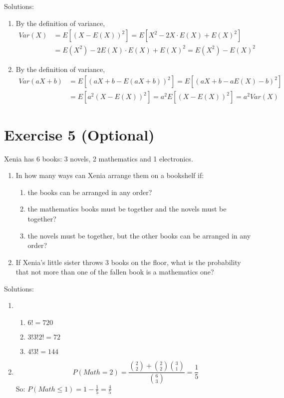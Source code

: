 \documentclass[12pt,thmsa]{article}
\begin{document}
\noindent Solutions:
\begin{enumerate}
\item By the definition of variance,
  \begin{align*}
    Var(X)&=E[(X-E(X))^2]=E[X^2-2X\cdot E(X)+E(X)^2]\\
    &=E(X^2)-2E(X)\cdot E(X)+E(X)^2=E(X^2)-E(X)^2
  \end{align*}
 \item By the definition of variance,
  \begin{align*}
    Var(aX+b)&=E[(aX+b-E(aX+b))^2]=E[(aX+b-aE(X)-b)^2]\\
&=E[a^2(X-E(X))^2]=a^2	E[(X-E(X))^2]=a^2Var(X)
   \end{align*}
\end{enumerate}




\section*{Exercise 5 (Optional)}

Xenia has 6 books: 3 novels, 2 mathematics and 1 electronics.
\begin{enumerate}
  \item In how many ways can Xenia arrange them on a bookshelf if:
\begin{enumerate}
  \item the books can be arranged in any order?
  \item the mathematics books must be together and the novels must be together?
  \item the novels must be together, but the other books can be arranged in any order?
\end{enumerate}
  \item If Xenia's little sister throws 3 books on the floor, what is the probability that not more than one of the fallen book
  is a mathematics one?
\end{enumerate}

\noindent Solutions:

\begin{enumerate}
  \item \begin{enumerate}
          \item $6!=720$
          \item $3!3!2!=72$
          \item $4!3!=144$
        \end{enumerate}
  \item $$P(Math=2)= \frac{{2 \choose 2} +{2 \choose 2} {3 \choose 1}}{{6 \choose 3}} =\frac{1}{5}$$
  So: $P(Math \leq 1)=1-\frac{1}{5}=\frac{4}{5}$
\end{enumerate}
\end{document}
